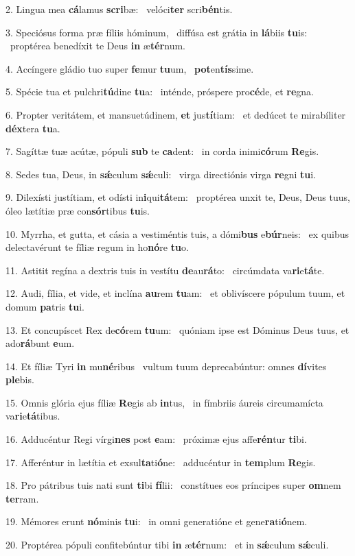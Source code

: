2. Lingua mea \textbf{cá}lamus \textbf{scri}bæ: \ast\  velóci\textbf{ter} scri\textbf{bén}tis.\

3. Speciósus forma præ fíliis hóminum, \dag\  diffúsa est grátia in \textbf{lá}biis \textbf{tu}is: \ast\  proptérea benedíxit te Deus \textbf{in} æ\textbf{tér}num.\

4. Accíngere gládio tuo super \textbf{fe}mur \textbf{tu}um, \ast\  \textbf{pot}en\textbf{tís}sime.\

5. Spécie tua et pulchri\textbf{tú}dine \textbf{tu}a: \ast\  inténde, próspere pro\textbf{cé}de, et \textbf{re}gna.\

6. Propter veritátem, et mansuetúdinem, \textbf{et} jus\textbf{tí}tiam: \ast\  et dedúcet te mirabíliter \textbf{déx}tera \textbf{tu}a.\

7. Sagíttæ tuæ acútæ, pópuli \textbf{sub} te \textbf{ca}dent: \ast\  in corda inimi\textbf{có}rum \textbf{Re}gis.\

8. Sedes tua, Deus, in \textbf{sǽ}culum \textbf{sǽ}culi: \ast\  virga directiónis virga \textbf{re}gni \textbf{tu}i.\

9. Dilexísti justítiam, et odísti in\textbf{i}qui\textbf{tá}tem: \ast\  proptérea unxit te, Deus, Deus tuus, óleo lætítiæ præ con\textbf{sór}tibus \textbf{tu}is.\

10. Myrrha, et gutta, et cásia a vestiméntis tuis, a dómi\textbf{bus} e\textbf{búr}neis: \ast\  ex quibus delectavérunt te fíliæ regum in ho\textbf{nó}re \textbf{tu}o.\

11. Astitit regína a dextris tuis in vestítu \textbf{de}au\textbf{rá}to: \ast\  circúmdata va\textbf{ri}e\textbf{tá}te.\

12. Audi, fília, et vide, et inclína \textbf{au}rem \textbf{tu}am: \ast\  et oblivíscere pópulum tuum, et domum \textbf{pa}tris \textbf{tu}i.\

13. Et concupíscet Rex de\textbf{có}rem \textbf{tu}um: \ast\  quóniam ipse est Dóminus Deus tuus, et ado\textbf{rá}bunt \textbf{e}um.\

14. Et fíliæ Tyri \textbf{in} mu\textbf{né}ribus \ast\  vultum tuum deprecabúntur: omnes \textbf{dí}vites \textbf{ple}bis.\

15. Omnis glória ejus fíliæ \textbf{Re}gis ab \textbf{in}tus, \ast\  in fímbriis áureis circumamícta va\textbf{ri}e\textbf{tá}tibus.\

16. Adducéntur Regi vírgi\textbf{nes} post \textbf{e}am: \ast\  próximæ ejus affe\textbf{rén}tur \textbf{ti}bi.\

17. Afferéntur in lætítia et exsul\textbf{ta}ti\textbf{ó}ne: \ast\  adducéntur in \textbf{tem}plum \textbf{Re}gis.\

18. Pro pátribus tuis nati sunt \textbf{ti}bi \textbf{fí}lii: \ast\  constítues eos príncipes super \textbf{om}nem \textbf{ter}ram.\

19. Mémores erunt \textbf{nó}minis \textbf{tu}i: \ast\  in omni generatióne et gene\textbf{ra}ti\textbf{ó}nem.\

20. Proptérea pópuli confitebúntur tibi \textbf{in} æ\textbf{tér}num: \ast\  et in \textbf{sǽ}culum \textbf{sǽ}culi.\

